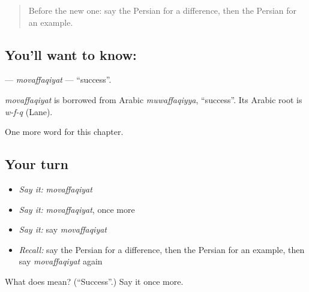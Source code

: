 \begin{quote}
Before the new one: say the Persian for a difference, then the Persian for an example.
\end{quote}

\subsection*{You'll want to know: }
\textbf{} — \emph{movaffaqiyat} — \textquotedblleft{}success\textquotedblright{}.

\begin{cousinweb}
\emph{movaffaqiyat} is borrowed from Arabic \emph{muwaffaqiyya}, \textquotedblleft{}success\textquotedblright{}. Its Arabic root is \emph{w-f-q} (Lane).
\end{cousinweb}

\begin{grammarlens}[title={What you've built}]
One more word for this chapter.
\end{grammarlens}

\subsection*{Your turn}
\begin{itemize}
\raggedright
  \item \emph{Say it:} \emph{movaffaqiyat}
  \item \emph{Say it:} \emph{movaffaqiyat}, once more
  \item \emph{Say it:} say \emph{movaffaqiyat}
  \item \emph{Recall:} say the Persian for a difference, then the Persian for an example, then say \emph{movaffaqiyat} again
\end{itemize}

\begin{tcolorbox}[breakable,colback=teal!4,colframe=teal!35!black,title={Before you move on}]
What does  mean? (\textquotedblleft{}Success\textquotedblright{}.) Say it once more.
\end{tcolorbox}
